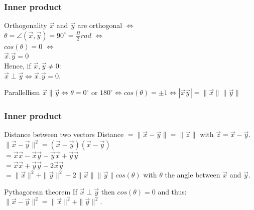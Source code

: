 \begin{frame}
	\frametitle{Inner product}
	\begin{block}{Orthogonality}
		$\overrightarrow{x}$ and $\overrightarrow{y}$ are orthogonal $\Leftrightarrow$\\ $\theta=\angle(\overrightarrow{x},\overrightarrow{y})=90^{\circ}=\frac{\Pi}{2} rad$ $\Leftrightarrow$\\
		$cos(\theta)=0$ $\Leftrightarrow$\\
		$\overrightarrow{x}.\overrightarrow{y}=0$\\
		\vspace{5mm}
		Hence, if $\overrightarrow{x},\overrightarrow{y} \neq 0$:\\
		$\overrightarrow{x}\perp\overrightarrow{y} \Leftrightarrow \overrightarrow{x}.\overrightarrow{y}=0$.
	\end{block} 
	\begin{block}{Parallellism}
		$\overrightarrow{x}\parallel\overrightarrow{y}\Leftrightarrow
		\theta=0^{\circ}$ or $180^{\circ} \Leftrightarrow
		cos(\theta)=\pm 1 \Leftrightarrow
		|\overrightarrow{x}\overrightarrow{y}|=\|\overrightarrow{x}\|\|\overrightarrow{y}\|$
	\end{block} 
\end{frame}

\begin{frame}
	\frametitle{Inner product}
	\begin{block}{Distance between two vectors}
		Distance $=\|\overrightarrow{x}-\overrightarrow{y}\|=\|\overrightarrow{z}\|$ with $\overrightarrow{z}=\overrightarrow{x}-\overrightarrow{y}$.\\
		$\|\overrightarrow{x}-\overrightarrow{y}\|^2=(\overrightarrow{x}-\overrightarrow{y}) (\overrightarrow{x}-\overrightarrow{y})$ \\
		$=\overrightarrow{x}\overrightarrow{x}-\overrightarrow{x}\overrightarrow{y}-\overrightarrow{y}\overrightarrow{x}+\overrightarrow{y}\overrightarrow{y}$ \\ 
		$=\overrightarrow{x}\overrightarrow{x}+\overrightarrow{y}\overrightarrow{y}-2\overrightarrow{x}\overrightarrow{y}$ \\
		$=\|\overrightarrow{x}\|^2+\|\overrightarrow{y}\|^2-2\|\overrightarrow{x}\|\|\overrightarrow{y}\|cos(\theta)$ with $\theta$ the angle between $\overrightarrow{x}$ and $\overrightarrow{y}$.
	\end{block}
	\begin{block}{Pythagorean theorem}
		If $\overrightarrow{x}\perp\overrightarrow{y}$ then $cos(\theta)=0$ and thus:\\
		$\|\overrightarrow{x}-\overrightarrow{y}\|^2=\|\overrightarrow{x}\|^2+\|\overrightarrow{y}\|^2$.
	\end{block} 
\end{frame}

